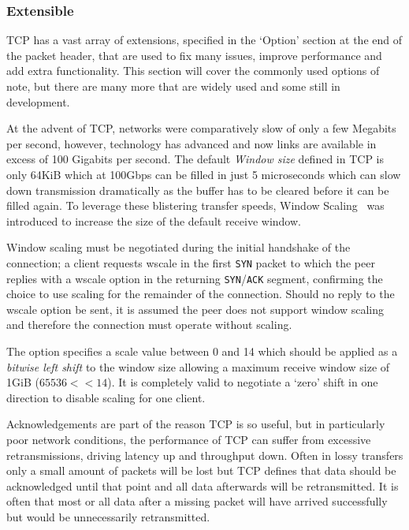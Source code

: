    \subsubsection{Extensible}
        TCP has a vast array of extensions, specified in the `Option' section at the end of the packet header, that are used to fix many issues, improve performance and add extra functionality. This section will cover the commonly used options of note, but there are many more that are widely used and some still in development.

        \label{sec:wscale}
            At the advent of TCP, networks were comparatively slow of only a few Megabits per second, however, technology has advanced and now links are available in excess of 100 Gigabits per second. The default \textit{Window size} defined in TCP is only 64KiB which at 100Gbps can be filled in just 5 microseconds which can slow down transmission dramatically as the buffer has to be cleared before it can be filled again. To leverage these blistering transfer speeds, Window Scaling~\cite[2]{rfc1323} was introduced to increase the size of the default receive window. 

            Window scaling must be negotiated during the initial handshake of the connection; a client requests wscale in the first \texttt{SYN} packet to which the peer replies with a wscale option in the returning \texttt{SYN}/\texttt{ACK} segment, confirming the choice to use scaling for the remainder of the connection. Should no reply to the wscale option be sent, it is assumed the peer does not support window scaling and therefore the connection must operate without scaling.

            The option specifies a scale value between 0 and 14 which should be applied as a \textit{bitwise left shift} to the window size allowing a maximum receive window size of 1GiB ($65536 << 14$). It is completely valid to negotiate a `zero' shift in one direction to disable scaling for one client.

        \label{sec:sack}
            Acknowledgements are part of the reason TCP is so useful, but in particularly poor network conditions, the performance of TCP can suffer from excessive retransmissions, driving latency up and throughput down. Often in lossy transfers only a small amount of packets will be lost but TCP defines that data should be acknowledged until that point and all data afterwards will be retransmitted. It is often that most or all data after a missing packet will have arrived successfully but would be unnecessarily retransmitted.

